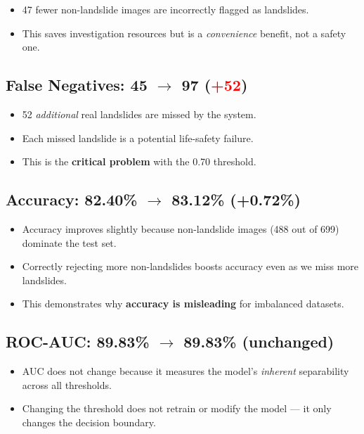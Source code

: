 \documentclass[11pt]{article}
\begin{document}
\begin{itemize}[noitemsep]
    \item 47 fewer non-landslide images are incorrectly flagged as landslides.
    \item This saves investigation resources but is a \textit{convenience} benefit, not a safety one.
\end{itemize}

\subsection{False Negatives: 45 $\to$ 97 (\textcolor{red}{+52})}

\begin{itemize}[noitemsep]
    \item 52 \textit{additional} real landslides are missed by the system.
    \item Each missed landslide is a potential life-safety failure.
    \item This is the \textbf{critical problem} with the 0.70 threshold.
\end{itemize}

\subsection{Accuracy: 82.40\% $\to$ 83.12\% (\textcolor{green!60!black}{+0.72\%})}

\begin{itemize}[noitemsep]
    \item Accuracy improves slightly because non-landslide images (488 out of 699) dominate the test set.
    \item Correctly rejecting more non-landslides boosts accuracy even as we miss more landslides.
    \item This demonstrates why \textbf{accuracy is misleading} for imbalanced datasets.
\end{itemize}

\subsection{ROC-AUC: 89.83\% $\to$ 89.83\% (unchanged)}

\begin{itemize}[noitemsep]
    \item AUC does not change because it measures the model's \textit{inherent} separability across all thresholds.
    \item Changing the threshold does not retrain or modify the model --- it only changes the decision boundary.
\end{itemize}
\end{document}
